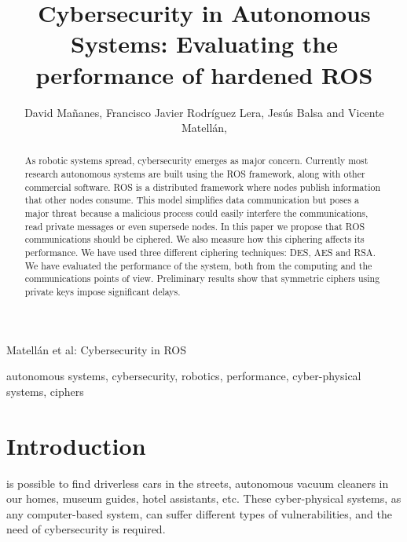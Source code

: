 \documentclass[journal,twoside]{JoPhA}
\begin{document}
\title{Cybersecurity in Autonomous Systems: Evaluating the performance of hardened ROS}

\author{David Ma\~nanes, Francisco Javier Rodr\'iguez Lera, Jes\'us Balsa and Vicente Matell\'an,
}


%
{Matell\'an et al: Cybersecurity in ROS}
\maketitle


\begin{abstract}
As robotic systems spread, cybersecurity emerges as major concern. Currently most research autonomous systems are built using the ROS framework, along with other commercial software. 
ROS is a distributed framework where nodes publish information that other nodes consume. 
This model simplifies data communication but poses a major threat because a malicious process could easily interfere the communications, read private messages or even supersede nodes. In this paper we propose that ROS communications should be ciphered. We also measure how this ciphering affects its performance. We have used three different ciphering techniques: DES, AES and RSA. We have evaluated the performance of the system, both from the computing and the communications points of view. Preliminary results show that symmetric ciphers using private keys impose significant delays.

\end{abstract}


\begin{IEEEkeywords}
autonomous systems, cybersecurity, robotics, performance, cyber-physical systems, ciphers
\end{IEEEkeywords}


\section{Introduction}

 is possible to find driverless cars in the streets, autonomous vacuum cleaners in our homes, museum guides, hotel assistants, etc. These cyber-physical systems, as any computer-based system, can suffer different types of vulnerabilities, and the need of cybersecurity \cite{Morante2015} is required. 
\end{document}
